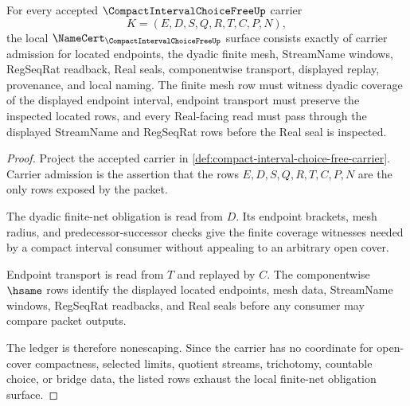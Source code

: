 \begin{theorem}\label{thm:compact-interval-choice-free-net-obligations}
For every accepted $\CompactIntervalChoiceFreeUp$ carrier
$$
K=(E,D,S,Q,R,T,C,P,N),
$$
the local $\NameCert_{\CompactIntervalChoiceFreeUp}$ surface consists exactly of carrier admission for located endpoints, the dyadic finite mesh, StreamName windows, RegSeqRat readback, Real seals, componentwise transport, displayed replay, provenance, and local naming. The finite mesh row must witness dyadic coverage of the displayed endpoint interval, endpoint transport must preserve the inspected located rows, and every Real-facing read must pass through the displayed StreamName and RegSeqRat rows before the Real seal is inspected.
\end{theorem}
\begin{proof}
Project the accepted carrier in \autoref{def:compact-interval-choice-free-carrier}. Carrier admission is the assertion that the rows $E,D,S,Q,R,T,C,P,N$ are the only rows exposed by the packet.

The dyadic finite-net obligation is read from $D$. Its endpoint brackets, mesh radius, and predecessor-successor checks give the finite coverage witnesses needed by a compact interval consumer without appealing to an arbitrary open cover.

Endpoint transport is read from $T$ and replayed by $C$. The componentwise $\hsame$ rows identify the displayed located endpoints, mesh data, StreamName windows, RegSeqRat readbacks, and Real seals before any consumer may compare packet outputs.

The ledger is therefore nonescaping. Since the carrier has no coordinate for open-cover compactness, selected limits, quotient streams, trichotomy, countable choice, or bridge data, the listed rows exhaust the local finite-net obligation surface.
\end{proof}

